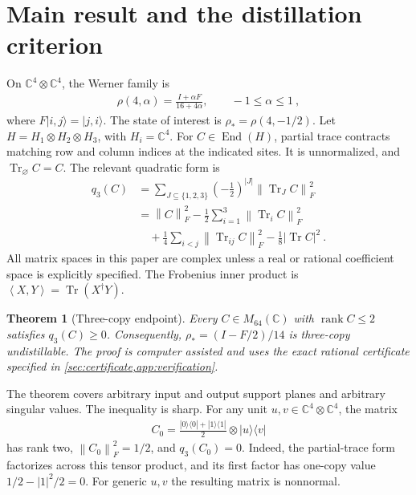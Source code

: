\documentclass[aps,pra,reprint,superscriptaddress,amsmath,amssymb,floatfix,nofootinbib]{revtex4-2}
\newcommand{\Tr}{\operatorname{Tr}}
\newcommand{\rk}{\operatorname{rank}}
\newcommand{\End}{\operatorname{End}}
\newcommand{\norm}[1]{\left\lVert#1\right\rVert}
\newcommand{\ip}[2]{\left\langle#1,#2\right\rangle}
\newcommand{\C}{\mathbb C}
\newtheorem{theorem}{Theorem}
\begin{document}
\section{Main result and the distillation criterion}
\label{sec:main}

On $\C^4\otimes\C^4$, the Werner family is
\begin{align}
 \rho(4,\alpha)=\frac{I+\alpha F}{16+4\alpha},
 \qquad -1\leq\alpha\leq1\ ,
 \label{eq:werner}
\end{align}
where $F|i,j\rangle=|j,i\rangle$.
The state of interest is $\rho_* = \rho(4,-1/2)$.
Let $H=H_1\otimes H_2\otimes H_3$, with $H_i=\C^4$.
For $C\in\End(H)$, partial trace contracts matching row and column indices
at the indicated sites. It is unnormalized, and $\Tr_\varnothing C=C$.
The relevant quadratic form is
\begin{align}
 q_3(C)
 &=\sum_{J\subseteq\{1,2,3\}}
       \left(-\frac12\right)^{|J|}\norm{\Tr_JC}_F^2\nonumber\\
 &=\norm C_F^2-\frac12\sum_{i=1}^3\norm{\Tr_iC}_F^2\nonumber\\
 &\quad+\frac14\sum_{i<j}\norm{\Tr_{ij}C}_F^2
   -\frac18|\Tr C|^2\ .
 \label{eq:q3}
\end{align}
All matrix spaces in this paper are complex unless a real or rational
coefficient space is explicitly specified. The Frobenius inner product
is $\ip XY=\Tr(X^\dagger Y)$.

\begin{theorem}[Three-copy endpoint]
\label{thm:d4-three-certificate}
Every $C\in M_{64}(\C)$ with $\rk C\leq2$ satisfies $q_3(C)\geq0$.
Consequently, $\rho_*=(I-F/2)/14$ is three-copy undistillable.
The proof is computer assisted and uses the exact rational certificate
specified in \cref{sec:certificate,app:verification}.
\end{theorem}

The theorem covers arbitrary input and output support planes and arbitrary
singular values. The inequality is sharp. For any unit
$u,v\in\C^4\otimes\C^4$, the matrix
\begin{align}
 C_0=\frac{|0\rangle\langle0|+|1\rangle\langle1|}{2}
                 \otimes |u\rangle\langle v|
 \label{eq:product-zero}
\end{align}
has rank two, $\norm{C_0}_F^2=1/2$, and $q_3(C_0)=0$.
Indeed, the partial-trace form factorizes across this tensor product,
and its first factor has one-copy value
$1/2-|1|^2/2=0$.
For generic $u,v$ the resulting matrix is nonnormal.
\end{document}
